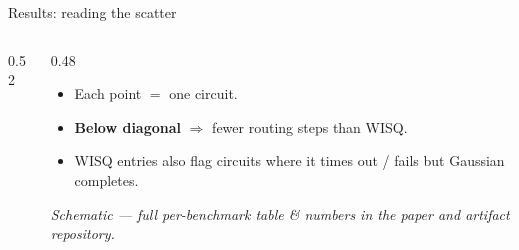 \documentclass[aspectratio=169,10pt]{beamer}
\begin{document}
\begin{frame}{Results: reading the scatter}
  \begin{columns}[c]
  \begin{column}{0.52\textwidth}
    \centering
  \end{column}
  \begin{column}{0.48\textwidth}
    \footnotesize
    \begin{itemize}
      \item Each point $=$ one circuit.
      \item \textcolor{ftgreen!55!black}{\textbf{Below diagonal}} $\Rightarrow$ fewer routing steps than WISQ.
      \item WISQ entries also flag circuits where it \alert{times out / fails} but Gaussian completes.
    \end{itemize}
    \vspace{6pt}
    {\scriptsize\itshape Schematic --- full per-benchmark table \& numbers in the paper and artifact repository.}
  \end{column}
  \end{columns}
\end{frame}
\end{document}
